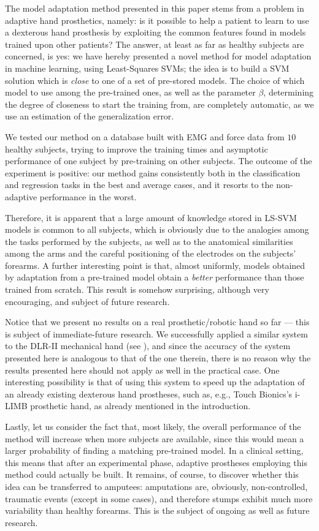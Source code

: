 The model adaptation method presented in this paper stems from a
problem in adaptive hand prosthetics, namely: is it possible to help a
patient to learn to use a dexterous hand prosthesis 
by exploiting the common features found in models trained upon other
patients?
The answer, at least as far as healthy subjects are concerned, is yes:
we have hereby presented a novel method for model adaptation in
machine learning, using Least-Squares SVMs; the idea is to build a SVM
solution which is \emph{close} to one of a set of pre-stored
models. The choice of which model to use among the pre-trained ones,
as well as the parameter $\beta$, determining the degree of closeness
to start the training from, are completely automatic, as we use an
estimation of the generalization error.

We tested our method on a database built with EMG and force data from
$10$ healthy subjects, trying to improve the training times and
asymptotic performance of one subject by pre-training on other
subjects. The outcome of the experiment is positive: our method gains
consistently both in the classification and regression tasks in the
best and average cases, and it resorts to the non-adaptive performance
in the worst.

Therefore, it is apparent that a large amount of knowledge stored in
LS-SVM models is common to all subjects, which is obviously due to the
analogies among the tasks performed by the subjects, as well as to the
anatomical similarities among the arms and the careful positioning of
the electrodes on the subjects' forearms. A further interesting point
is that, almost uniformly, models obtained by adaptation from a
pre-trained model obtain a \emph{better} performance than those
trained from scratch. This result is somehow surprising, although very
encouraging, and subject of future research.

Notice that we present no results on a real prosthetic/robotic hand so far --- this is subject of immediate-future research. We successfully applied a similar system to the DLR-II mechanical hand (see \cite{2008.ICRA,2008.BioCyb}), and since the accuracy of the system presented here is analogous to that of the one therein, there is no reason why the results presented here should not apply as well in the practical case. One interesting possibility is that of using this system to speed up the adaptation of an already existing dexterous hand prostheses, such as, e.g., Touch Bionics's i-LIMB \cite{ilimb} prosthetic hand, as already mentioned in the introduction.

Lastly, let us consider the fact that, most likely, the overall
performance of the method will increase when more subjects are
available, since this would mean a larger probability of finding a
matching pre-trained model. In a clinical setting, this means that
after an experimental phase, adaptive prostheses employing this method
could actually be built. It remains, of course, to discover whether
this idea can be transferred to amputees: amputations are, obviously,
non-controlled, traumatic events (except in some cases), and therefore
stumps exhibit much more variability than healthy forearms. This is
the subject of ongoing as well as future research.
